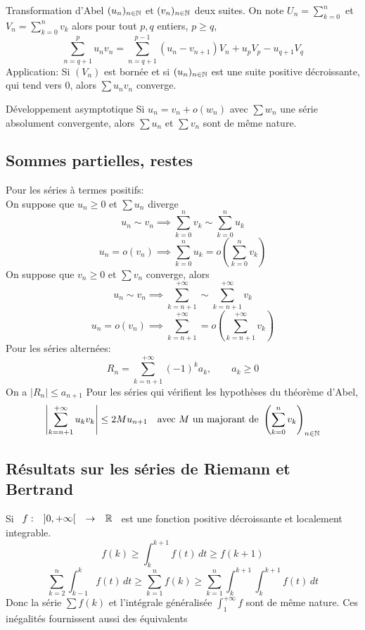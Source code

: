 \documentclass[]{report}
\begin{document}
\begin{dfprop}{Transformation d'Abel}{}
    $(u_n)_{n\in\mathbb{N}}$ et $(v_n)_{n\in\mathbb{N}}$ deux suites. On note $U_n=\sum_{k=0}^{n}$ et $V_n=\sum_{k=0}^{n} v_k$ alors pour tout $p,q$ entiers, $p\ge q$,
    \[\sum_{n=q+1}^{p} u_n v_n=\sum_{n=q+1}^{p-1}(u_n-v_{n+1}) V_n +u_p V_p -u_{q+1} V_q\]
    Application: Si $(V_n)$ est bornée et si $(u_n)_{n\in\mathbb{N}}$ est une suite positive décroissante, qui tend vers $0$, alors $\sum u_nv_n$ converge.
\end{dfprop}

\begin{dfprop}{Développement asymptotique}{}
    Si $u_n=v_n+o (w_n)$ avec $\sum w_n$ une série absolument convergente, alors $\sum u_n$ et $\sum v_n$ sont de même nature.
\end{dfprop}

\subsection*{Sommes partielles, restes}

Pour les séries à termes positifs:\\
On suppose que $u_n\ge 0$ et $\sum u_n$ diverge\\
\[u_n\sim v_n\implies  \sum_{k=0}^{n} v_k \sim \sum_{k=0}^{n} u_k\]
\[u_n=o(v_n)\implies \sum_{k=0}^{n} u_k = o\left( \sum_{k=0}^{n} v_k\right)\]
On suppose que $v_n\ge 0$ et $\sum v_n$ converge, alors\\
\[u_n \sim v_n\implies \sum_{k=n+1}^{+\infty}\sim \sum_{k=n+1}^{+\infty} v_k\]
\[u_n=o(v_n) \implies \sum_{k=n+1}^{+\infty}= o \left(\sum_{k=n+1}^{+\infty} v_k\right)\]
Pour les séries alternées:
\[R_n=\sum_{k=n+1}^{+\infty}(-1)^{k} a_k,\qquad a_k\ge 0\]
On a $\left|R_n\right|\le a_{n+1}$
Pour les séries qui vérifient les hypothèses du théorème d'Abel,
\[\left|\sum_{k=n+1}^{+\infty} u_k v_k\right|\le 2 M u_{n+1}\quad \text{avec $M$ un majorant de }\left(\sum_{k=0}^{n} v_k\right)_{{n\in\mathbb{N}}}\]

\subsection*{Résultats sur les séries de Riemann et Bertrand}

Si $\begin{array}{ccccc} f : & ]0,+\infty[ & \to & \mathbb{R} \end{array}$ est une fonction positive décroissante et localement integrable.
\[f(k)\ge \int_{k}^{k+1} f(t)\, dt \ge f(k+1)\]
\[\sum_{k=2}^{n}\int_{k-1}^{k} f(t)\, dt \ge \sum_{k=1}^{n} f(k) \ge \sum_{k=1}^{n} \int_{k}^{k+1} \int_{k}^{k+1} f(t)\, dt\]
Donc la série $\sum f(k)$ et l'intégrale généralisée $\int_{1}^{+\infty}f$ sont de même nature. Ces inégalités fournissent aussi des équivalents
\end{document}
